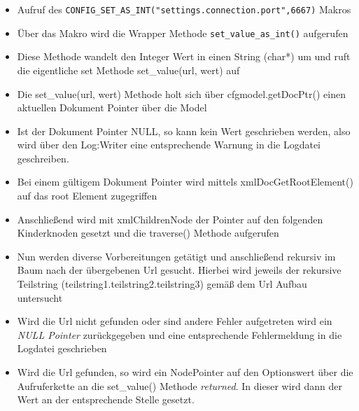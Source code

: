 \begin{itemize}

\item Aufruf des \verb+CONFIG_SET_AS_INT("settings.connection.port",6667)+ Makros
\item Über das Makro wird die Wrapper Methode \verb+set_value_as_int()+ aufgerufen
\item Diese Methode wandelt den Integer Wert in einen String (char*) um und ruft die eigentliche set Methode set\_value(url, wert) auf
\item Die set\_value(url, wert) Methode holt sich über cfgmodel.getDocPtr() einen aktuellen Dokument Pointer über die Model
\item Ist der Dokument Pointer NULL, so kann kein Wert geschrieben werden, also wird über den Log:Writer
          eine entsprechende Warnung in die Logdatei geschreiben.
\item Bei einem gültigem Dokument Pointer wird  mittels xmlDocGetRootElement() auf das root Element zugegriffen
\item Anschließend wird mit xmlChildrenNode der Pointer auf den folgenden Kinderknoden gesetzt und die traverse() Methode aufgerufen
\item Nun werden diverse Vorbereitungen getätigt und anschließend rekursiv im Baum nach der übergebenen
Url gesucht. Hierbei wird jeweils der rekursive Teilstring (teilstring1.teilstring2.teilstring3) gemäß dem Url Aufbau untersucht
           
\item Wird die Url nicht gefunden oder sind andere Fehler aufgetreten wird ein \emph{NULL Pointer} zurückgegeben und eine entsprechende Fehlermeldung in die Logdatei geschrieben
\item Wird die Url gefunden, so wird ein NodePointer auf den Optionswert über die Aufruferkette an die set\_value() Methode \emph{returned}. In dieser wird dann der Wert an der entsprechende Stelle gesetzt.  
\end{itemize}


